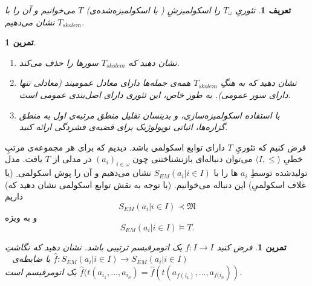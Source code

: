 \documentclass[12pt,a4paper]{report}
\theoremstyle{colorhead}
\newtheorem{tam}[thm]{تمرین}
\newtheorem{defn}[thm]{تعریف}
\begin{document}
\begin{defn}
تئوریِ
$T_\omega$
را
اسکولمیزشِ ( یا اسکولمیزه‌شده‌ی)
$T$
می‌خوانیم و آن را با
$T_{skolem}$
نشان می‌دهیم.
\end{defn}
\begin{tam}
\hfill
\begin{enumerate}
\item 
نشان دهید که 
$T_{skolem}$
سورها را حذف می‌کند.
\item
نشان دهید که به هنگِ
$T_{skolem}$
همه‌ی جمله‌ها دارای معادل عمومیند (معادلی تنها دارای سور عمومی). به طور خاص، این تئوری دارای 
 اصل‌بندی عمومی است.
\item 
با استفاده اسکولمیزه‌سازی، و بدینسان تقلیل منطق مرتبه‌ی اول به منطق گزاره‌ها، اثباتی توپولوژیک برای قضیه‌ی فشردگی ارائه کنید.
\end{enumerate}
\end{tam}
فرض کنیم که تئوریِ
$T$
دارای توابع اسکولمی باشد. دیدیم که برای هر مجموعه‌ی مرتبِ خطیِ
$\langle I,\leq\rangle$
می‌توان دنباله‌ای بازنشناختنی چون
$(a_i)_{i\in \omega}$
در مدلی از
$T$
یافت. مدل تولیدشده‌ توسطِ
$a_i$
ها را با 
$S_{EM}(a_i|i\in I)$
نشان می‌دهیم و آن را پوش اسکولمی ِ
(یا غلاف اسکولمیِ)
این دنباله می‌خوانیم. (با توجه به نقش توابع اسکولمی نشان دهید که) داریم
\[
S_{EM}(a_i|i\in I)\prec \mathfrak{M}
\]
و به ويژه
\[
S_{EM}(a_i|i\in I)\models T.
\]
\begin{tam}
فرض کنید
$f:I\to I$
یک اتومرفیسم ترتیبی باشد. نشان دهید که نگاشتِ
$\hat{f}:S_{EM}(a_i|i\in I)\to S_{EM}(a_i|i\in I)$
با ضابطه‌ی
\mbox{
$\hat{f}(t(a_{i_1},\ldots,a_{i_n})=
\hat{f}(t(a_{f(i_1)},\ldots,a_{f(i_n}))$}
یک اتومرفیسم است. 
\end{tam}
\newpage 
\end{document}
